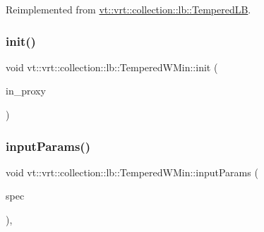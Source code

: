 Reimplemented from \hyperlink{structvt_1_1vrt_1_1collection_1_1lb_1_1_tempered_l_b_aa0a6aa39e0f4c6a3328ef153bf23984b}{vt\+::vrt\+::collection\+::lb\+::\+Tempered\+LB}.

\mbox{\label{structvt_1_1vrt_1_1collection_1_1lb_1_1_tempered_w_min_a4568be2f1baa683968308e48a0743dea}} 
\subsubsection{\texorpdfstring{init()}{init()}}
{\footnotesize\ttfamily void vt\+::vrt\+::collection\+::lb\+::\+Tempered\+W\+Min\+::init (\begin{DoxyParamCaption}\item[{\hyperlink{structvt_1_1objgroup_1_1proxy_1_1_proxy}{objgroup\+::proxy\+::\+Proxy}$<$ \hyperlink{structvt_1_1vrt_1_1collection_1_1lb_1_1_tempered_w_min}{Tempered\+W\+Min} $>$}]{in\+\_\+proxy }\end{DoxyParamCaption})}

\mbox{\label{structvt_1_1vrt_1_1collection_1_1lb_1_1_tempered_w_min_acac5be655a5286211177c83e5379efae}} 
\subsubsection{\texorpdfstring{input\+Params()}{inputParams()}}
{\footnotesize\ttfamily void vt\+::vrt\+::collection\+::lb\+::\+Tempered\+W\+Min\+::input\+Params (\begin{DoxyParamCaption}\item[{\hyperlink{structvt_1_1vrt_1_1collection_1_1balance_1_1_spec_entry}{balance\+::\+Spec\+Entry} $\ast$}]{spec }\end{DoxyParamCaption})\hspace{0.3cm}{\ttfamily [override]}, {\ttfamily [virtual]}}



